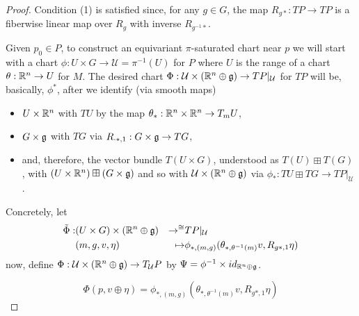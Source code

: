 \begin{proof}
Condition (1) is satisfied since, for any $g \in G$, the map $R_{g*}:TP \to TP$ is a fiberwise linear map over $R_g$ with inverse $R_{g^{-1} *}$.

Given $p_0 \in P$, to construct an equivariant $\pi$-saturated chart near $p$ we will start with a chart $\phi:U \times G \to \mathcal U = \pi^{-1}(U)$ for $P$ where $U$ is the range of a chart $\theta:\mathbb{R}^n \to U$ for $M$. The desired chart $\Phi: \mathcal U \times (\mathbb{R}^n \oplus \mathfrak{g}) \to TP|_{\mathcal U}$ for $TP$ will be, basically, $\phi^*$, after we identify (via smooth maps) 
    \begin{itemize}
    
    \item $U \times \mathbb{R}^n$ with $TU$ by the map $\theta_{*}: \mathbb{R}^n \times \mathbb{R}^n \to T_m U$,  
    
    \item $G \times \mathfrak{g}$ with $TG$ via $R_{\cdot *, 1}: G \times \mathfrak{g} \to T G$,
    
    \item and, therefore, the vector bundle $T(U \times G)$, understood as $T(U) \boxplus T(G)$, with $(U \times \mathbb{R}^n) \boxplus (G \times \mathfrak{g})$ and so with $\mathcal U \times (\mathbb{R}^n \oplus \mathfrak{g})$ via $\phi_*: TU \boxplus TG \to TP|_{\mathcal U}$.
    
    \end{itemize}

Concretely, let
\begin{align*}
    \tilde \Phi :& (U \times G) \times (\RR^n \oplus \alg g) & \to^{\cong} & TP|_{\mathcal U} \\    
                 & (m, g, v, \eta) & \mapsto & \phi_{*, (m, g)}(\theta_{*, \theta^{-1}(m)} v, R_{g*, 1} \eta) 
\end{align*}
now, define $\Phi : \mathcal U \times (\mathbb{R}^n \oplus \mathfrak{g})  \to  T_{\mathcal U}P$ by $\Psi = \phi^{-1} \times id_{\RR^n \oplus \alg g}$. %

\[
    \Phi(p, v \oplus \eta) = \phi_{*, (m, g)}(\theta_{*, \theta^{-1}(m)} v, R_{g*, 1} \eta)
\]


\end{proof}

